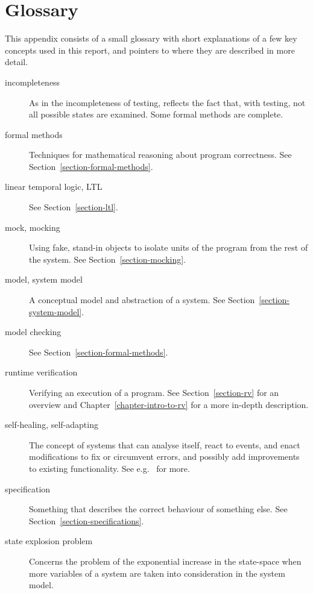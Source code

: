 \chapter{Glossary} \label{appendix-glossary}

This appendix consists of a small glossary with short explanations of a few
key concepts used in this report, and pointers to where they are described in
more detail.

\begin{description}
  \item[incompleteness] As in the incompleteness of testing, reflects the fact
    that, with testing, not all possible states are examined. Some formal
    methods are complete.

  \item[formal methods] Techniques for mathematical reasoning about program
    correctness. See Section~\ref{section-formal-methods}.

  \item[linear temporal logic, LTL] See Section~\ref{section-ltl}.

  \item[mock, mocking] Using fake, stand-in objects to isolate units of the
    program from the rest of the system. See Section~\ref{section-mocking}.

  \item[model, system model] A conceptual model and abstraction of a system.
    See Section~\ref{section-system-model}.

  \item[model checking] See Section~\ref{section-formal-methods}.

  \item[runtime verification] Verifying an execution of a program. See
    Section~\ref{section-rv} for an overview and
    Chapter~\ref{chapter-intro-to-rv} for a more in-depth description.

  \item[self-healing, self-adapting] The concept of systems that can analyse
    itself, react to events, and enact modifications to fix or circumvent
    errors, and possibly add improvements to existing functionality. See e.g.\
    \cite{huebscher08survey} for more.

  \item[specification] Something that describes the correct behaviour of
    something else. See Section~\ref{section-specifications}.

  \item[state explosion problem] Concerns the problem of the exponential
    increase in the state-space when more variables of a system are taken into
    consideration in the system model.


\end{description}

